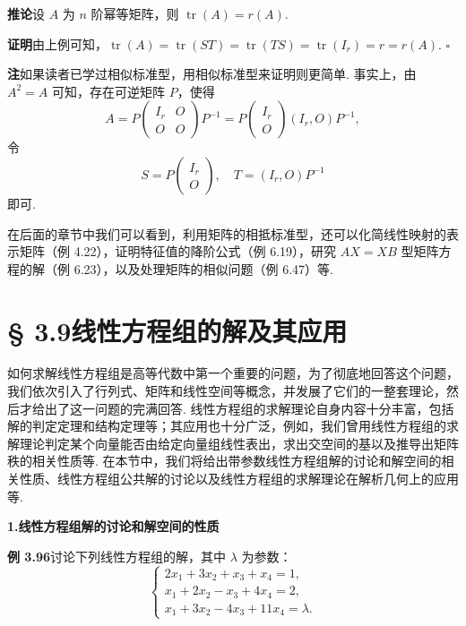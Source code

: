 \documentclass[UTF8, 12pt, fontset=fandol, oneside]{ctexart}
\begin{document}
\noindent\textbf{推论}\quad 设 $A$ 为 $n$ 阶幂等矩阵，则 $\operatorname{tr}(A)=r(A)$.

\noindent\textbf{证明}\quad 由上例可知，$\operatorname{tr}(A)=\operatorname{tr}(ST)=\operatorname{tr}(TS)=\operatorname{tr}(I_r)=r=r(A)$. $\square$

\noindent\textbf{注}\quad 如果读者已学过相似标准型，用相似标准型来证明则更简单. 事实上，由 $A^2=A$ 可知，存在可逆矩阵 $P$，使得
\[
A=P\begin{pmatrix}I_r&O\\O&O\end{pmatrix}P^{-1}
=P\begin{pmatrix}I_r\\O\end{pmatrix}(I_r,O)P^{-1},
\]
令
\[
S=P\begin{pmatrix}I_r\\O\end{pmatrix},\quad T=(I_r,O)P^{-1}
\]
即可.

在后面的章节中我们可以看到，利用矩阵的相抵标准型，还可以化简线性映射的表示矩阵（例 4.22），证明特征值的降阶公式（例 6.19），研究 $AX=XB$ 型矩阵方程的解（例 6.23），以及处理矩阵的相似问题（例 6.47）等.

\section*{§ 3.9\quad 线性方程组的解及其应用}

如何求解线性方程组是高等代数中第一个重要的问题，为了彻底地回答这个问题，我们依次引入了行列式、矩阵和线性空间等概念，并发展了它们的一整套理论，然后才给出了这一问题的完满回答. 线性方程组的求解理论自身内容十分丰富，包括解的判定定理和结构定理等；其应用也十分广泛，例如，我们曾用线性方程组的求解理论判定某个向量能否由给定向量组线性表出，求出交空间的基以及推导出矩阵秩的相关性质等. 在本节中，我们将给出带参数线性方程组解的讨论和解空间的相关性质、线性方程组公共解的讨论以及线性方程组的求解理论在解析几何上的应用等.

\noindent\textbf{1.\quad 线性方程组解的讨论和解空间的性质}

\noindent\textbf{例 3.96}\quad 讨论下列线性方程组的解，其中 $\lambda$ 为参数：
\[
\begin{cases}
2x_1+3x_2+x_3+x_4=1,\\
x_1+2x_2-x_3+4x_4=2,\\
x_1+3x_2-4x_3+11x_4=\lambda.
\end{cases}
\]
\end{document}
